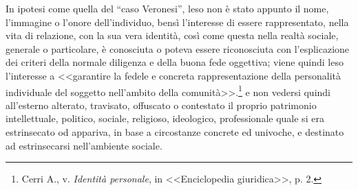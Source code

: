 In ipotesi come quella del “caso Veronesi”, leso non è stato appunto il nome, l’immagine o l’onore dell’individuo, bensì l’interesse di essere rappresentato, nella vita di relazione, con la sua vera identità, così come questa nella realtà sociale, generale o particolare, è conosciuta o poteva essere riconosciuta con l'esplicazione dei criteri della normale diligenza e della buona fede oggettiva; viene quindi leso l'interesse a <<garantire la fedele e concreta rappresentazione della personalità individuale del soggetto nell'ambito della comunità>>.\footnote{Cerri A., v. \textit{Identità personale}, in <<Enciclopedia giuridica>>,  p. 2.} e non vedersi quindi all'esterno alterato, travisato, offuscato o contestato il proprio patrimonio intellettuale, politico, sociale, religioso, ideologico, professionale quale si era estrinsecato od appariva, in base a circostanze concrete ed univoche, e destinato ad estrinsecarsi nell'ambiente sociale. 
